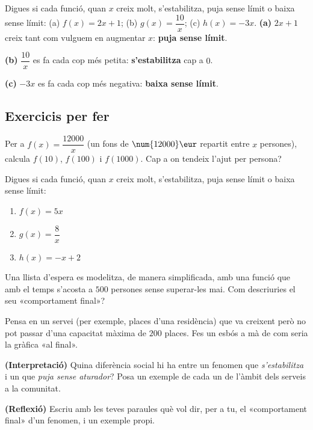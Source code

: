 \begin{exresolt}
Digues si cada funció, quan $x$ creix molt, s'estabilitza, puja sense límit o baixa
sense límit: (a) $f(x)=2x+1$; (b) $g(x)=\dfrac{10}{x}$; (c) $h(x)=-3x$.
\solucio
\textbf{(a)} $2x+1$ creix tant com vulguem en augmentar $x$: \textbf{puja sense límit}.

\textbf{(b)} $\dfrac{10}{x}$ es fa cada cop més petita: \textbf{s'estabilitza} cap a $0$.

\textbf{(c)} $-3x$ es fa cada cop més negativa: \textbf{baixa sense límit}.
\end{exresolt}

\subsection{Exercicis per fer}

\begin{exercicis}
\begin{exlist}
  \item Per a $f(x)=\dfrac{\num{12000}}{x}$ (un fons de $\num{12000}\eur$ repartit
        entre $x$ persones), calcula $f(10)$, $f(100)$ i $f(1000)$. Cap a on tendeix
        l'ajut per persona?
  \item Digues si cada funció, quan $x$ creix molt, s'estabilitza, puja sense límit o
        baixa sense límit:
        \begin{enumerate}[label=\alph*), leftmargin=1.6em, topsep=2pt]
          \item $f(x)=5x$ \hfill \item $g(x)=\dfrac{8}{x}$ \hfill \item $h(x)=-x+2$
        \end{enumerate}
  \item Una llista d'espera es modelitza, de manera simplificada, amb una funció que
        amb el temps s'acosta a $500$ persones sense superar-les mai. Com descriuries
        el seu «comportament final»?
  \item Pensa en un servei (per exemple, places d'una residència) que va creixent però
        no pot passar d'una capacitat màxima de $200$ places. Fes un esbós a mà de com
        seria la gràfica «al final».
  \item \textbf{(Interpretació)} Quina diferència social hi ha entre un fenomen que
        \emph{s'estabilitza} i un que \emph{puja sense aturador}? Posa un exemple de
        cada un de l'àmbit dels serveis a la comunitat.
  \item \textbf{(Reflexió)} Escriu amb les teves paraules què vol dir, per a tu, el
        «comportament final» d'un fenomen, i un exemple propi.
\end{exlist}
\end{exercicis}

